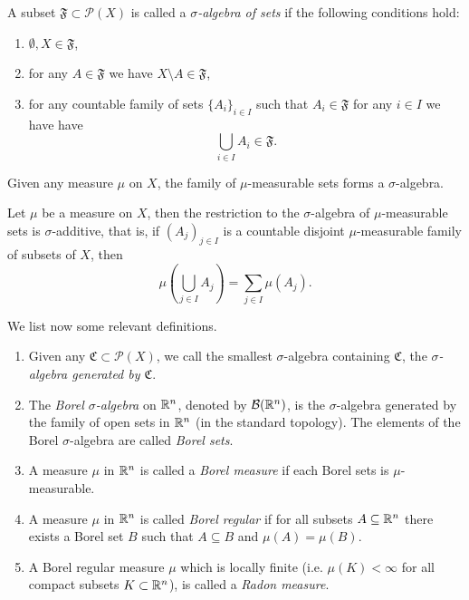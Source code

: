 \begin{definition}
A subset $\mathfrak{F} \subset \mathcal{P}(X)$ is called a \emph{$\sigma$-algebra of
sets} if the following conditions hold:
\begin{enumerate}[(1)]
\item $\emptyset,X \in \mathfrak{F}$,
\item for any $A \in \mathfrak{F}$ we have $X\setminus A \in \mathfrak{F}$,
\item for any countable family of sets $\{A_i\}_{i \in I}$ such that $A_{i} \in \mathfrak{F}$ for any $i \in I$ we have 
have $$\bigcup_{i\in I} A_i \in \mathfrak{F}.$$
\end{enumerate}
\end{definition}

\begin{theorem}
Given any measure $\mu$ on $X$, the family of $\mu$-measurable sets forms a $\sigma$-algebra.
\end{theorem}

\begin{theorem}
Let $\mu$ be a measure on $X$, then the restriction to the
$\sigma$-algebra of $\mu$-measurable sets is $\sigma$-additive, that is, if
$(A_j)_{j\in I}$ is a countable disjoint $\mu$-measurable family of
subsets of $X$, then 
\[
\mu\left(\bigcup_{j \in I} A_j\right) = \sum_{j\in I} \mu\left(A_j\right).
\]
\end{theorem}

We list now some relevant definitions.

\begin{definition} \hfill
\begin{enumerate}[(1)]
\item Given any $\mathfrak{C} \subset \mathcal{P}(X)$, we call the smallest
$\sigma$-algebra containing $\mathfrak{C}$, the \emph{$\sigma$-algebra generated by
$\mathfrak{C}$}.%
\item The \emph{Borel $\sigma$-algebra} on $\mathbb{R}^n$, denoted by $\mathcal{B}(\mathbb{R}^n)$, is the
$\sigma$-algebra generated by the family of open sets in $\mathbb{R}^n$ (in the standard
topology). The elements of the Borel $\sigma$-algebra are called \emph{Borel sets}.
\item A measure $\mu$ in $\mathbb{R}^n$ is called a \emph{Borel measure} if each
Borel sets is $\mu$-measurable.
\item A measure $\mu$ in $\mathbb{R}^n$ is called \emph{Borel regular} if for
all subsets $A \subseteq \mathbb{R}^n$ there exists a Borel set $B$ such that $A \subseteq
B$ and $\mu(A) = \mu(B)$.
\item A Borel regular measure $\mu$ which is locally finite (i.e. $\mu(K) <
\infty$ for all compact subsets $K \subset \mathbb{R}^n$), is called a \emph{Radon measure}.
\end{enumerate}
\end{definition}

